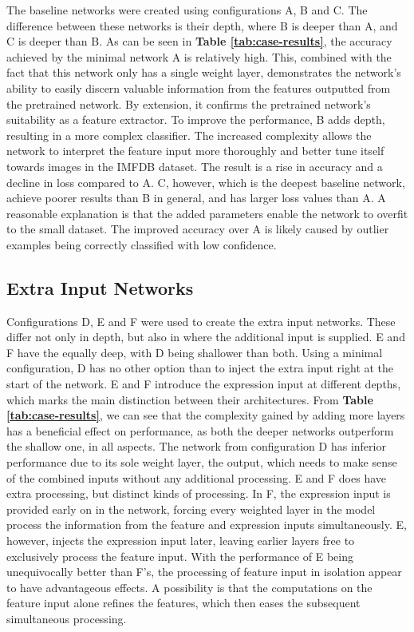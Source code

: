 The baseline networks were created using configurations A, B and C. The difference between these networks is their depth, where B is deeper than A, and C is deeper than B. As can be seen in \textbf{Table \ref{tab:case-results}}, the accuracy achieved by the minimal network A is relatively high. This, combined with the fact that this network only has a single weight layer, demonstrates the network's ability to easily discern valuable information from the features outputted from the pretrained network. By extension, it confirms the pretrained network's suitability as a feature extractor. To improve the performance, B adds depth, resulting in a more complex classifier. The increased complexity allows the network to interpret the feature input more thoroughly and better tune itself towards images in the IMFDB dataset. The result is a rise in accuracy and a decline in loss compared to A. C, however, which is the deepest baseline network, achieve poorer results than B in general, and has larger loss values than A. A reasonable explanation is that the added parameters enable the network to overfit to the small dataset. The improved accuracy over A is likely caused by outlier examples being correctly classified with low confidence.

\subsection{Extra Input Networks}

Configurations D, E and F were used to create the extra input networks. These differ not only in depth, but also in where the additional input is supplied. E and F have the equally deep, with D being shallower than both. Using a minimal configuration, D has no other option than to inject the extra input right at the start of the network. E and F introduce the expression input at different depths, which marks the main distinction between their architectures. From \textbf{Table \ref{tab:case-results}}, we can see that the complexity gained by adding more layers has a beneficial effect on performance, as both the deeper networks outperform the shallow one, in all aspects. The network from configuration D has inferior performance due to its sole weight layer, the output, which needs to make sense of the combined inputs without any additional processing. E and F does have extra processing, but distinct kinds of processing. In F, the expression input is provided early on in the network, forcing every weighted layer in the model process the information from the feature and expression inputs simultaneously. E, however, injects the expression input later, leaving earlier layers free to exclusively process the feature input. With the performance of E being unequivocally better than F's, the processing of feature input in isolation appear to have advantageous effects. A possibility is that the computations on the feature input alone refines the features, which then eases the subsequent simultaneous processing. 

